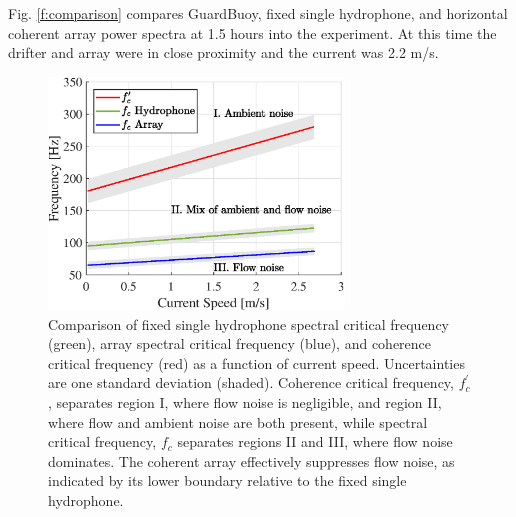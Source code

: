 \documentclass[12pt,journal,onecolumn]{IEEEtran}
\begin{document}
Fig. \ref{f:comparison} compares GuardBuoy, fixed single hydrophone, and horizontal coherent array power spectra at 1.5 hours into the experiment. At this time the drifter and array were in close proximity and the current was 2.2 m/s. 
\begin{figure}[!t]
	\begin{center}
		\includegraphics[width=0.7\textwidth]{figure7.eps}
	\end{center}
	\caption[Comparison of spectral sloping and spatial coherence thresholding]{
	\label{f:array_perform}
	Comparison of fixed single hydrophone spectral critical frequency (green), array spectral critical frequency (blue), and coherence critical frequency (red) as a function of current speed. Uncertainties are one standard deviation (shaded). Coherence critical frequency, $f^\prime_c$, separates region I, where flow noise is negligible, and region II, where flow and ambient noise are both present, while spectral critical frequency, $f_c$  separates regions II and III, where flow noise dominates. The coherent array effectively suppresses flow noise, as indicated by its lower boundary relative to the fixed single hydrophone. }
\end{figure}
\end{document}
